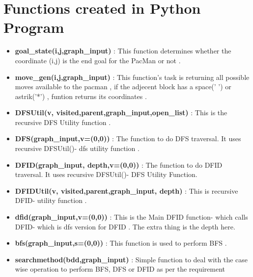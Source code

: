 \documentclass{article}
\begin{document}
\section{Functions created in Python Program}
\vspace{20pt}
\begin{itemize}
    \item \textbf{goal\_state(i,j,graph\_input)} : This function determines whether the coordinate (i,j) is the end goal for the PacMan or not .
    \item \textbf{move\_gen(i,j,graph\_input)} : This function's task is returning all possible moves available to the pacman
    , if the adjecent block has a space(' ') or astrik('*') 
    , funtion returns its coordinates .
    \item \textbf{DFSUtil(v, visited,parent,graph\_input,open\_list)} : This is the recursive DFS Utility function .
    \item \textbf{DFS(graph\_input,v=(0,0))} : The function to do DFS traversal. It uses recursive DFSUtil()- dfs utility function .
    \item \textbf{DFID(graph\_input, depth,v=(0,0))} : The function to do DFID traversal. It uses recursive DFSUtil()- DFS Utility Function.
    \item \textbf{DFIDUtil(v, visited,parent,graph\_input, depth)} : This is recursive DFID- utility function .
    \item \textbf{dfid(graph\_input,v=(0,0))} :  This is the Main DFID function- which calls DFID- which is dfs version for DFID . The extra thing is the depth here.
    \item \textbf{bfs(graph\_input,s=(0,0))} : This function is used to perform BFS .
    \item \textbf{searchmethod(bdd,graph\_input)} : Simple function to deal with the case wise operation to perform BFS, DFS or DFID as per the requirement
\end{itemize}
\newpage
\end{document}
